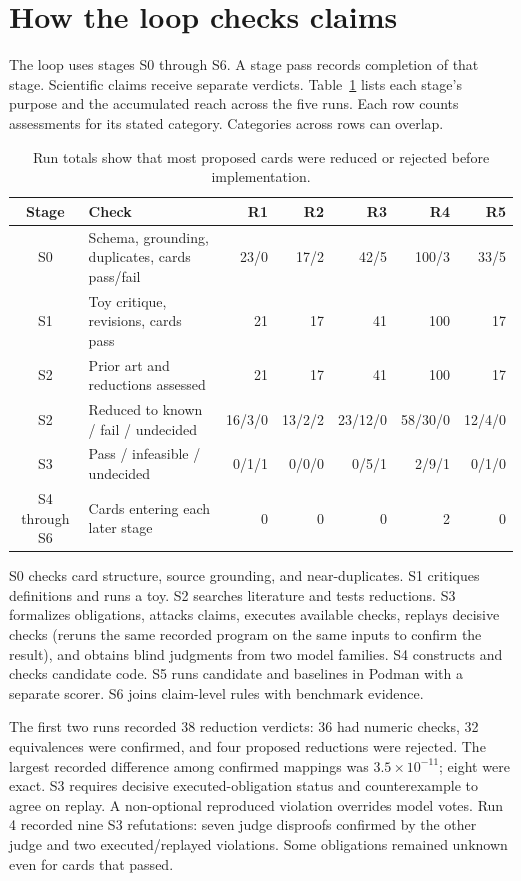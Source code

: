 \section{How the loop checks claims}

The loop uses stages S0 through S6. A stage pass records completion of that stage. Scientific claims receive separate verdicts. Table~\ref{tab:gates} lists each stage's purpose and the accumulated reach across the five runs. Each row counts assessments for its stated category. Categories across rows can overlap.

\begin{table}[ht]
\centering\scriptsize
\caption{Run totals show that most proposed cards were reduced or rejected before implementation.}
\label{tab:gates}
\begin{tabular}{clrrrrr}
\toprule
Stage & Check & R1 & R2 & R3 & R4 & R5 \\
\midrule
S0 & Schema, grounding, duplicates, cards pass/fail & 23/0 & 17/2 & 42/5 & 100/3 & 33/5 \\
S1 & Toy critique, revisions, cards pass & 21 & 17 & 41 & 100 & 17 \\
S2 & Prior art and reductions assessed & 21 & 17 & 41 & 100 & 17 \\
S2 & Reduced to known / fail / undecided & 16/3/0 & 13/2/2 & 23/12/0 & 58/30/0 & 12/4/0 \\
S3 & Pass / infeasible / undecided & 0/1/1 & 0/0/0 & 0/5/1 & 2/9/1 & 0/1/0 \\
S4 through S6 & Cards entering each later stage & 0 & 0 & 0 & 2 & 0 \\
\bottomrule
\end{tabular}
\end{table}

S0 checks card structure, source grounding, and near-duplicates. S1 critiques definitions and runs a toy. S2 searches literature and tests reductions. S3 formalizes obligations, attacks claims, executes available checks, replays decisive checks (reruns the same recorded program on the same inputs to confirm the result), and obtains blind judgments from two model families. S4 constructs and checks candidate code. S5 runs candidate and baselines in Podman with a separate scorer. S6 joins claim-level rules with benchmark evidence.

The first two runs recorded 38 reduction verdicts: 36 had numeric checks, 32 equivalences were confirmed, and four proposed reductions were rejected. The largest recorded difference among confirmed mappings was $3.5\times10^{-11}$; eight were exact. S3 requires decisive executed-obligation status and counterexample to agree on replay. A non-optional reproduced violation overrides model votes. Run 4 recorded nine S3 refutations: seven judge disproofs confirmed by the other judge and two executed/replayed violations. Some obligations remained unknown even for cards that passed.

